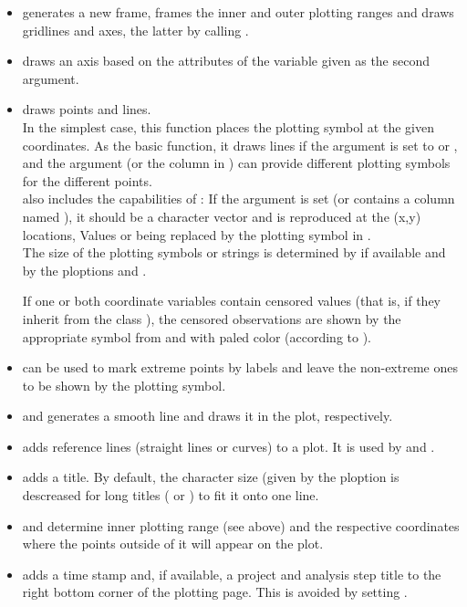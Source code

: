 \documentclass[11pt]{article}\usepackage[]{graphicx}\usepackage[]{color}
\begin{document}
\begin{itemize}
\item 
   generates a new frame, frames the inner and outer plotting
  ranges and draws gridlines and axes, the latter by calling . 
\item
   draws an axis based on the attributes of the variable given as
  the second argument.   
\item
{} draws points and lines. \\
  In the simplest case, this function places the plotting symbol at the
  given coordinates. As the basic  function, it draws lines if 
  the argument  is set to  or , and the argument
   (or the column  in ) can provide
  different plotting symbols for the different points.\\

   also includes the capabilities of : 
  If the argument  
  is set (or  contains a column named ),
  it should be a character vector and is reproduced at the (x,y) locations,
  Values  or  being replaced by the plotting symbol in .\\
  The size of the plotting symbols or strings is determined by
   if available and by the ploptions
   and .

  If one or both coordinate variables contain censored values (that is,
  if they inherit from the class ), the censored observations are
  shown by the appropriate symbol from  and 
  with paled color (according to ).
\item
   can be used to mark extreme points by labels and leave the
  non-extreme ones to be shown by the plotting symbol.
\item
   and  generates a smooth line and draws it 
  in the plot, respectively.
\item
   adds reference lines (straight lines or curves) to a plot.
  It is used by  and .
\item
   adds a title. By default, the character size 
  (given by the ploption  is descreased
  for long titles ( or ) to fit it onto one line.
\item
   and  determine inner plotting range 
  (see above) and the respective coordinates where the points outside of it
  will appear on the plot.
\item
   adds a time stamp and, if available, a project and analysis
  step title to the right bottom corner of the plotting page.
  This is avoided by setting .
\end{itemize}
\end{document}
